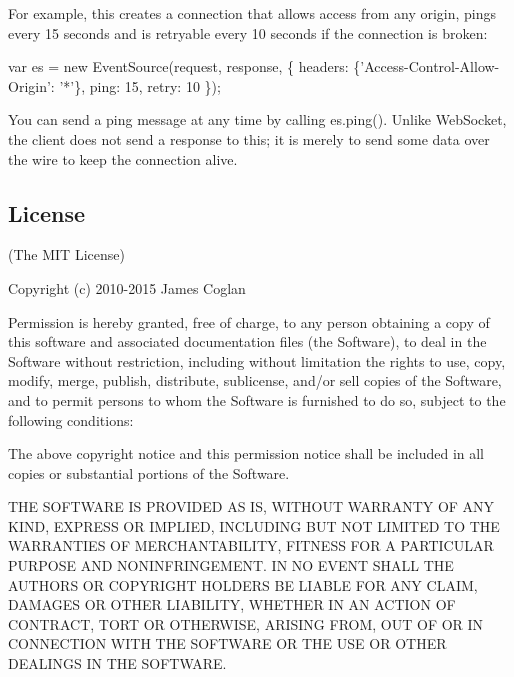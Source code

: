 For example, this creates a connection that allows access from any origin, pings every 15 seconds and is retryable every 10 seconds if the connection is broken\+:


\begin{DoxyCode}
var es = new EventSource(request, response, \{
  headers: \{'Access-Control-Allow-Origin': '*'\},
  ping:    15,
  retry:   10
\});
\end{DoxyCode}


You can send a ping message at any time by calling {\ttfamily es.\+ping()}. Unlike Web\+Socket, the client does not send a response to this; it is merely to send some data over the wire to keep the connection alive.

\subsection*{License}

(The M\+IT License)

Copyright (c) 2010-\/2015 James Coglan

Permission is hereby granted, free of charge, to any person obtaining a copy of this software and associated documentation files (the \textquotesingle{}Software\textquotesingle{}), to deal in the Software without restriction, including without limitation the rights to use, copy, modify, merge, publish, distribute, sublicense, and/or sell copies of the Software, and to permit persons to whom the Software is furnished to do so, subject to the following conditions\+:

The above copyright notice and this permission notice shall be included in all copies or substantial portions of the Software.

T\+HE S\+O\+F\+T\+W\+A\+RE IS P\+R\+O\+V\+I\+D\+ED \textquotesingle{}AS IS\textquotesingle{}, W\+I\+T\+H\+O\+UT W\+A\+R\+R\+A\+N\+TY OF A\+NY K\+I\+ND, E\+X\+P\+R\+E\+SS OR I\+M\+P\+L\+I\+ED, I\+N\+C\+L\+U\+D\+I\+NG B\+UT N\+OT L\+I\+M\+I\+T\+ED TO T\+HE W\+A\+R\+R\+A\+N\+T\+I\+ES OF M\+E\+R\+C\+H\+A\+N\+T\+A\+B\+I\+L\+I\+TY, F\+I\+T\+N\+E\+SS F\+OR A P\+A\+R\+T\+I\+C\+U\+L\+AR P\+U\+R\+P\+O\+SE A\+ND N\+O\+N\+I\+N\+F\+R\+I\+N\+G\+E\+M\+E\+NT. IN NO E\+V\+E\+NT S\+H\+A\+LL T\+HE A\+U\+T\+H\+O\+RS OR C\+O\+P\+Y\+R\+I\+G\+HT H\+O\+L\+D\+E\+RS BE L\+I\+A\+B\+LE F\+OR A\+NY C\+L\+A\+IM, D\+A\+M\+A\+G\+ES OR O\+T\+H\+ER L\+I\+A\+B\+I\+L\+I\+TY, W\+H\+E\+T\+H\+ER IN AN A\+C\+T\+I\+ON OF C\+O\+N\+T\+R\+A\+CT, T\+O\+RT OR O\+T\+H\+E\+R\+W\+I\+SE, A\+R\+I\+S\+I\+NG F\+R\+OM, O\+UT OF OR IN C\+O\+N\+N\+E\+C\+T\+I\+ON W\+I\+TH T\+HE S\+O\+F\+T\+W\+A\+RE OR T\+HE U\+SE OR O\+T\+H\+ER D\+E\+A\+L\+I\+N\+GS IN T\+HE S\+O\+F\+T\+W\+A\+RE. 